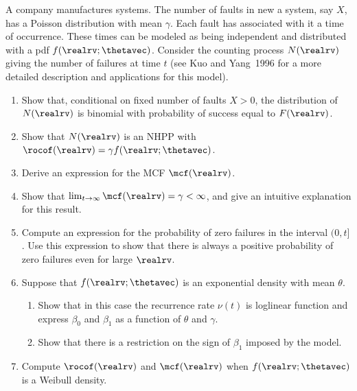 \begin{exercise1}
A company manufactures systems. The number of faults in new a
system, say $X$, has a Poisson distribution with mean $\gamma$.
Each fault has associated with it a time of occurrence. These times
can be modeled as being independent and distributed with a pdf
$f(\realrv;\thetavec)$. Consider the counting process $N(\realrv)$
giving the number of failures at time $t$ (see Kuo and Yang~1996
for a more detailed description and applications for this model).
\begin{enumerate}
\item
Show that, conditional on fixed number of faults $X>0$, the distribution of
$N(\realrv)$ is binomial with probability of success equal
to $F(\realrv)$.
\item
Show that $N(\realrv)$ is an NHPP with $\rocof(\realrv)=\gamma
f(\realrv; \thetavec)$.
\item
Derive an expression for the MCF $\mcf(\realrv)$.
\item
Show that $\lim_{t \to \infty}\mcf(\realrv)=\gamma<\infty$, and give an
intuitive explanation for this result.
\item
Compute an expression for the probability of zero failures in the
interval $(0,t]$.  Use this expression to show that there is always
a positive probability of zero failures even for large $\realrv$.
\item
Suppose that $f(\realrv;\thetavec)$ is an exponential density with mean
$\theta$.
\begin{enumerate}
\item
Show that in this case the recurrence rate $\nu(t)$
is loglinear function and express $\beta_{0}$
and $\beta_{1}$ as a function of $\theta$ and $\gamma$.
\item
Show that there is a restriction on the sign of $\beta_{1}$ imposed
by the model.
\end{enumerate}
\item
Compute $\rocof(\realrv)$ and $\mcf(\realrv)$ when $f(\realrv;
\thetavec)$ is a Weibull density.
\end{enumerate}
\end{exercise1}

